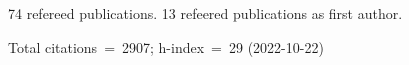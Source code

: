 74 refereed publications. 13 refeered publications as first author.

Total citations~=~2907; h-index~=~29 (2022-10-22)